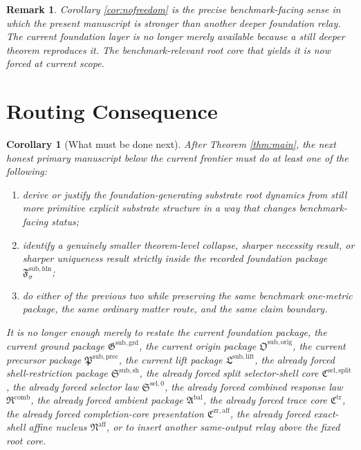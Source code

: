 \documentclass[11pt]{article}
\newcommand{\OriginPackage}{\mathfrak O^{\mathrm{sub,orig}}}
\newcommand{\GroundPackage}{\mathfrak G^{\mathrm{sub,grd}}}
\newcommand{\FoundationPackage}{\mathfrak F^{\mathrm{sub,fdn}}}
\newcommand{\PrecursorPackage}{\mathfrak P^{\mathrm{sub,prec}}}
\newcommand{\LiftPackage}{\mathfrak L^{\mathrm{sub,lift}}}
\newcommand{\ShellRestriction}{\mathfrak S^{\mathrm{sub,sh}}}
\newcommand{\SelectorCore}{\mathfrak C^{\mathrm{sel,split}}}
\newcommand{\SelectorLaw}{\mathfrak S^{\mathrm{sel},0}}
\newcommand{\CombinedLaw}{\mathfrak R^{\mathrm{comb}}}
\newcommand{\AmbientPackage}{\mathfrak A^{\mathrm{bal}}}
\newcommand{\TraceCore}{\mathfrak C^{\mathrm{tr}}}
\newcommand{\CompletionCore}{\mathfrak C^{\mathrm{zr,aff}}}
\newcommand{\AffineNucleus}{\mathfrak N^{\mathrm{aff}}}
\newtheorem{remark}{Remark}
\newtheorem{corollary}{Corollary}
\begin{document}
\begin{remark}
Corollary \ref{cor:nofreedom} is the precise benchmark-facing sense in which the present manuscript is stronger than another deeper foundation relay. The current foundation layer is no longer merely available because a still deeper theorem reproduces it. The benchmark-relevant root core that yields it is now forced at current scope.
\end{remark}

\section{Routing Consequence}

\begin{corollary}[What must be done next]
\label{cor:next}
After Theorem \ref{thm:main}, the next honest primary manuscript below the current frontier must do at least one of the following:
\begin{enumerate}
    \item derive or justify the foundation-generating substrate root dynamics from still more primitive explicit substrate structure in a way that changes benchmark-facing status;
    \item identify a genuinely smaller theorem-level collapse, sharper necessity result, or sharper uniqueness result strictly inside the recorded foundation package \(\FoundationPackage_{\sigma}\);
    \item do either of the previous two while preserving the same benchmark one-metric package, the same ordinary matter route, and the same claim boundary.
\end{enumerate}
It is no longer enough merely to restate the current foundation package, the current ground package \(\GroundPackage\), the current origin package \(\OriginPackage\), the current precursor package \(\PrecursorPackage\), the current lift package \(\LiftPackage\), the already forced shell-restriction package \(\ShellRestriction\), the already forced split selector-shell core \(\SelectorCore\), the already forced selector law \(\SelectorLaw\), the already forced combined response law \(\CombinedLaw\), the already forced ambient package \(\AmbientPackage\), the already forced trace core \(\TraceCore\), the already forced completion-core presentation \(\CompletionCore\), the already forced exact-shell affine nucleus \(\AffineNucleus\), or to insert another same-output relay above the fixed root core.
\end{corollary}
\end{document}
